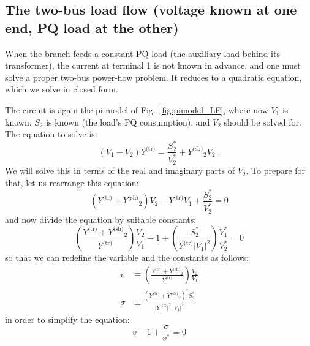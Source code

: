 \documentclass[a4paper,11pt]{article}
\providecommand{\abs}[1]{\lvert#1\rvert}
\newcommand{\Ytr}{\ensuremath{Y^{\textrm{(tr)}}}}
\newcommand{\Ysh}{\ensuremath{Y^{\textrm{(sh)}}}}
\begin{document}
\subsection{The two-bus load flow (voltage known at one end, PQ load at the other)}
\label{sec:twobus}

When the branch feeds a constant-PQ load (the auxiliary load behind its transformer),
the current at terminal 1 is not known in advance, and one must solve a proper two-bus
power-flow problem. It reduces to a quadratic equation, which we solve in closed form.

The circuit is again the pi-model of Fig.~\ref{fig:pimodel_LF}, where now $V_1$ is
known, $S_2$ is known (the load's PQ consumption), and $V_2$ should be solved for. The
equation to solve is:
\begin{equation*}
  (V_1 - V_2) \Ytr = \frac{S_2^*}{V_2^*} + \Ysh_2 V_2 \;.
\end{equation*}
We will solve this in terms of the real and imaginary parts of $V_2$. To prepare for
that, let us rearrange this equation:
\begin{equation*}
  (\Ytr + \Ysh_2) V_2 - \Ytr V_1  +  \frac{S_2^*}{V_2^*}  = 0
\end{equation*}
and now divide the equation by suitable constants:
\begin{equation*}
  \left( \frac{\Ytr + \Ysh_2}{\Ytr} \right) \frac{V_2}{V_1} - 1
  + \left( \frac{S_2^*}{\Ytr \abs{V_1}^2} \right) \frac{V_1^*}{V_2^*}  = 0
\end{equation*}
so that we can redefine the variable and the constants as follows:
\begin{equation}
  \label{eq:V2defs}
  \begin{split}
  v & \equiv \left( \frac{\Ytr + \Ysh_2}{\Ytr} \right) \frac{V_2}{V_1} \\
  \sigma & \equiv \frac{\left( \Ytr+\Ysh_2 \right)^* S_2^*}{\abs{\Ytr}^2 \, \abs{V_1}^2}
  \end{split}
\end{equation}
in order to simplify the equation:
\begin{equation}
  v - 1 + \frac{\sigma}{v^*}  = 0
\end{equation}
\end{document}
